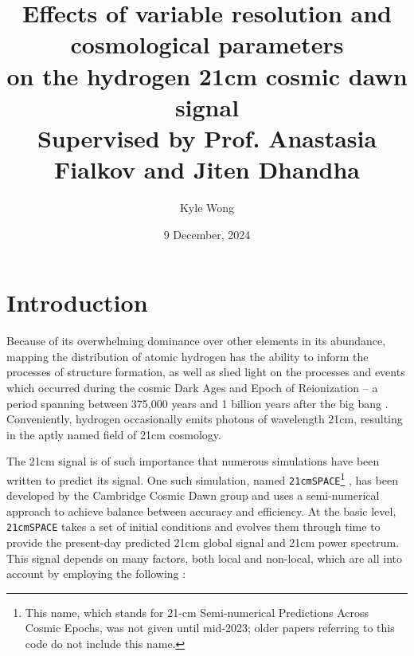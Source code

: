 \documentclass[floats,floatfix,showpacs,amssymb,prd,superscriptaddress,nofootinbib]{revtex4-2} %
\newcommand{\code}{\texttt}
\begin{document}
\title{{\titlefont Effects of variable resolution and cosmological parameters
\\on the hydrogen 21cm cosmic dawn signal}\\{\small Supervised by Prof. Anastasia Fialkov and Jiten Dhandha}}
\date{9 December, 2024}
\author{Kyle Wong}


\maketitle
\section{Introduction}

Because of its overwhelming dominance over other elements in its abundance, mapping the distribution of atomic hydrogen has the ability to inform the processes of structure formation, as well as shed light on the processes and events which occurred during the cosmic Dark Ages and Epoch of Reionization -- a period spanning between 375,000 years and 1 billion years after the big bang \cite{Pritchard_2012}. Conveniently, hydrogen occasionally emits photons of wavelength 21cm, resulting in the aptly named field of 21cm cosmology.



The 21cm signal is of such importance that numerous simulations have been written to predict its signal. One such simulation, named \code{21cmSPACE}\footnote{This name, which stands for 21-cm Semi-numerical Predictions Across Cosmic Epochs, was not given until mid-2023; older papers referring to this code do not include this name.} \cite{Fialkov_2014}, has been developed by the Cambridge Cosmic Dawn group and uses a semi-numerical approach to achieve balance between accuracy and efficiency. At the basic level, \code{21cmSPACE} takes a set of initial conditions and evolves them through time to provide the present-day predicted 21cm global signal and 21cm power spectrum. This signal depends on many factors, both local and non-local, which are all into account by employing the following \cite{gessey-jones_2024}:
\end{document}
